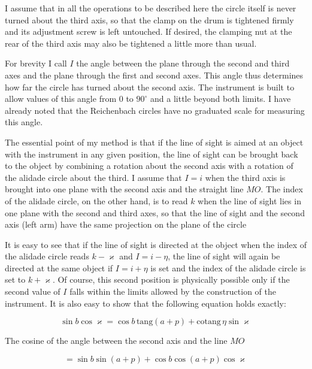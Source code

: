 \par\indent I assume that in all the operations to be described here the circle itself is never turned about the third axis, so that the clamp on the drum is tightened firmly and its adjustment screw is left untouched. If desired, the clamping nut at the rear of the third axis may also be tightened a little more than usual.

\par\indent For brevity I call $I$ the angle between the plane through the second and third axes and the plane through the first and second axes. This angle thus determines how far the circle has turned about the second axis. The instrument is built to allow values of this angle from $0$ to $90^\circ$ and a little beyond both limits. I have already noted that the Reichenbach circles have no graduated scale for measuring this angle.

\par\indent The essential point of my method is that if the line of sight is aimed at an object with the instrument in any given position, the line of sight can be brought back to the object by combining a rotation about the second axis with a rotation of the alidade circle about the third. I assume that $I = i$ when the third axis is brought into one plane with the second axis and the straight line $MO$. The index of the alidade circle, on the other hand, is to read $k$ when the line of sight lies in one plane with the second and third axes, so that the line of sight and the second axis (left arm) have the same projection on the plane of the circle

\par\indent It is easy to see that if the line of sight is directed at the object when the index of the alidade circle reads $k-\varkappa$ and $I=i-\eta$, the line of sight will again be directed at the same object if $I=i+\eta$ is set and the index of the alidade circle is set to $k+\varkappa$. Of course, this second position is physically possible only if the second value of $I$ falls within the limits allowed by the construction of the instrument. It is also easy to show that the following equation holds exactly:

\[ \sin b \cos\varkappa = \cos b\, \mathrm{tang}(a+p) + \mathrm{cotang}\,\eta \sin\varkappa \]

\noindent The cosine of the angle between the second axis and the line $MO$

\[ = \sin b \sin(a+p) + \cos b \cos(a+p) \cos\varkappa \]


